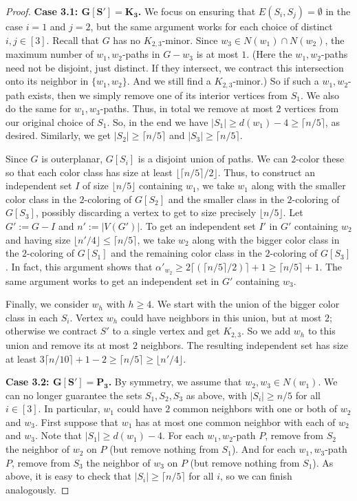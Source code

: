\documentclass[11pt]{article}
\theoremstyle{definition}
\newcommand\floor[1]{\lfloor#1\rfloor}
\newcommand\ceil[1]{\lceil#1\rceil}
\renewcommand\ge\geqslant
\renewcommand\le\leqslant
\begin{document}
\begin{proof}
\textbf{Case 3.1: $\bm{G[S']=K_3}$.}
We focus on ensuring that $E(S_i,S_j)=\emptyset$ in the case $i=1$ and $j=2$, but the same argument works for each choice of distinct $i,j\in[3]$.
Recall that $G$ has no $K_{2,3}$-minor.  Since $w_3\in N(w_1)\cap N(w_2)$, the maximum number of $w_1,w_2$-paths in $G-w_3$ is at most $1$.
(Here the $w_1,w_2$-paths need not be disjoint, just distinct.  If they intersect, we contract this intersection onto its neighbor in 
$\{w_1,w_2\}$.  And we still find a $K_{2,3}$-minor.)  So if such a $w_1,w_2$-path exists, then we simply remove one of its interior
vertices from $S_1$.  We also do the same for $w_1,w_3$-paths.  Thus, in total we remove at most $2$ vertices from our original choice of $S_1$.
So, in the end we have $|S_1|\ge d(w_1)-4 \ge \lceil n/5\rceil$, as desired.  Similarly, we get $|S_2|\ge \lceil n/5\rceil$ and 
$|S_3|\ge \lceil n/5\rceil$.

Since $G$ is outerplanar, $G[S_i]$ is a disjoint union of paths.  We can $2$-color these so that each color class has size at least 
$\lfloor \lceil n/5\rceil/2\rfloor$.  Thus, to construct an independent set $I$ of size $\lfloor n/5\rfloor$ containing $w_1$, we take $w_1$
along with the smaller color class in the $2$-coloring of $G[S_2]$ and the smaller class in the $2$-coloring of $G[S_3]$, 
possibly discarding a vertex to get to size precisely $\lfloor n/5\rfloor$.  Let $G':=G-I$ and $n':=|V(G')|$.  To get an independent set $I'$
in $G'$ containing $w_2$ and having size $\lfloor n'/4\rfloor\le \lceil n/5\rceil$, we take $w_2$ along with the bigger color class in the 
$2$-coloring of $G[S_1]$ and the remaining color class in the $2$-coloring of $G[S_3]$.  
In fact, this argument shows that $\alpha'_{w_2} \ge 2\lceil(\lceil n/5\rceil/2)\rceil + 1 \ge \lceil n/5\rceil+1$.
The same argument works to get an independent set in $G'$ containing $w_3$.

Finally, we consider $w_h$ with $h\ge 4$.  We start with the union of the bigger color class in each $S_i$.  Vertex $w_h$ could have neighbors in
this union, but at most $2$; otherwise we contract $S'$ to a single vertex and get $K_{2,3}$.  So we add $w_h$ to this union and remove its at 
most $2$ neighbors.  The resulting independent set has size at least $3\ceil{n/10}+1-2 \ge \ceil{n/5} \ge \floor{n'/4}$.

\textbf{Case 3.2: $\bm{G[S']=P_3}$.}
By symmetry, we assume that $w_2,w_3\in N(w_1)$.
We can no longer guarantee the sets $S_1,S_2,S_3$ as above, with $|S_i|\ge n/5$ for all $i\in [3]$.
In particular, $w_1$ could have $2$ common neighbors with one or both of $w_2$ and $w_3$.
First suppose that $w_1$ has at most one common neighbor with each of $w_2$ and $w_3$.  Note that $|S_1|\ge d(w_1)-4$.  
For each $w_1,w_2$-path $P$, remove from $S_2$ the neighbor of $w_2$ on $P$ (but remove nothing from $S_1$).
And for each $w_1,w_3$-path $P$, remove from $S_3$ the neighbor of $w_3$ on $P$ (but remove nothing from $S_1$).
As above, it is easy to check that $|S_i|\ge \ceil{n/5}$ for all $i$, so we can finish analogously.


\end{proof}
\end{document}
